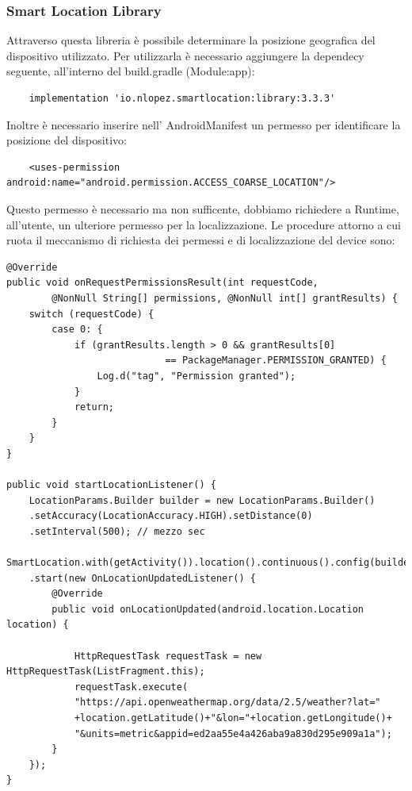 \documentclass{article}
\begin{document}
\subsubsection{Smart Location Library}
Attraverso questa libreria è possibile determinare la posizione geografica del dispositivo utilizzato. Per utilizzarla è necessario aggiungere la
dependecy seguente, all'interno del build.gradle (Module:app):
\begin{lstlisting}
    implementation 'io.nlopez.smartlocation:library:3.3.3'
\end{lstlisting}
Inoltre è necessario inserire nell' AndroidManifest un permesso per identificare la posizione del dispositivo:
\begin{lstlisting}
    <uses-permission android:name="android.permission.ACCESS_COARSE_LOCATION"/>
\end{lstlisting}
Questo permesso è necessario ma non sufficente, dobbiamo richiedere a Runtime, all'utente, un ulteriore permesso
per la localizzazione. Le procedure attorno a cui ruota il meccanismo di richiesta dei permessi
e di localizzazione del device sono:
\begin{lstlisting}
@Override
public void onRequestPermissionsResult(int requestCode,
        @NonNull String[] permissions, @NonNull int[] grantResults) {
    switch (requestCode) {
        case 0: {
            if (grantResults.length > 0 && grantResults[0] 
                            == PackageManager.PERMISSION_GRANTED) {
                Log.d("tag", "Permission granted");
            }
            return;
        }
    }
}

public void startLocationListener() {
    LocationParams.Builder builder = new LocationParams.Builder()
    .setAccuracy(LocationAccuracy.HIGH).setDistance(0)
    .setInterval(500); // mezzo sec
    SmartLocation.with(getActivity()).location().continuous().config(builder.build())
    .start(new OnLocationUpdatedListener() {
        @Override
        public void onLocationUpdated(android.location.Location location) {

            HttpRequestTask requestTask = new HttpRequestTask(ListFragment.this);
            requestTask.execute(
            "https://api.openweathermap.org/data/2.5/weather?lat="
            +location.getLatitude()+"&lon="+location.getLongitude()+
            "&units=metric&appid=ed2aa55e4a426aba9a830d295e909a1a");
        }
    });
}
\end{lstlisting}
\end{document}
